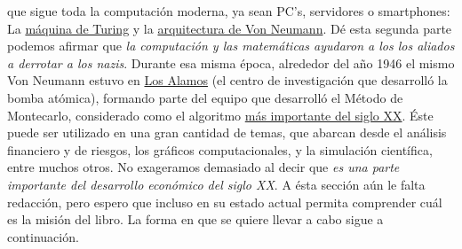\documentclass{article}
\begin{document}
que sigue toda la computación moderna, ya sean PC's, servidores o smartphones: La
\href{https://es.wikipedia.org/wiki/M\%C3\%A1quina_de_Turing}{máquina de Turing}
y la
\href{https://es.wikipedia.org/wiki/Arquitectura_de_von_Neumann}{arquitectura de Von Neumann}.
Dé esta segunda parte podemos afirmar que \emph{la computación y las matemáticas ayudaron a los
los aliados a derrotar a los nazis}.
\newline\newline
Durante esa misma época, alrededor del año 1946 el mismo Von Neumann estuvo en
\href{https://es.wikipedia.org/wiki/Laboratorio_Nacional_de_Los_\%C3\%81lamos}{Los Alamos} 
(el centro de investigación que desarrolló la bomba atómica), formando parte del 
equipo que desarrolló el Método de Montecarlo, considerado como el algoritmo
\href{http://www.uta.edu/faculty/rcli/TopTen/topten.pdf}{más importante del siglo XX}.
Éste puede ser utilizado en una gran cantidad de temas, que abarcan desde el análisis financiero y de riesgos, los gráficos computacionales, y la simulación científica, entre muchos otros. No exageramos demasiado al decir que \emph{es una parte importante del desarrollo económico del siglo XX}.
\newline\newline
A ésta sección aún le falta redacción, pero espero que incluso en su estado actual
permita comprender cuál es la misión del libro. La forma en que se quiere llevar a
cabo sigue a continuación.
\end{document}
